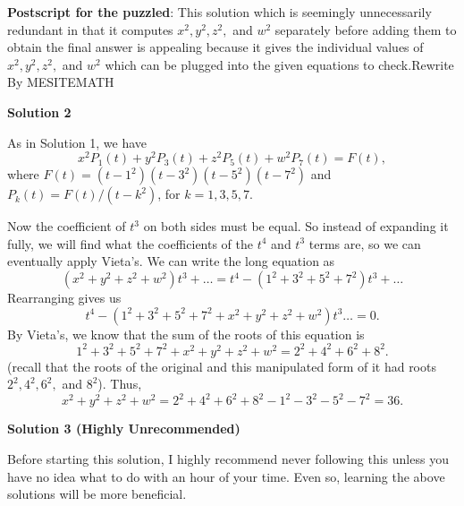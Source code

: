 \begin{enumerate}
 \textbf{Postscript for the puzzled}: This solution which is seemingly unnecessarily redundant in that it computes $x^2,y^2,z^2,$ and $w^2$ separately before adding them to obtain the final answer is appealing because it gives the individual values of $x^2,y^2,z^2,$ and $w^2$ which can be plugged into the given equations to check.Rewrite By MESITEMATH

 



\textbf{Solution 2}

As in Solution 1, we have 
 \[x^2P_1(t)+y^2P_3(t)+z^2P_5(t)+w^2P_7(t)=F(t),\]where $F(t)=(t-1^2)(t-3^2)(t-5^2)(t-7^2)$ and $P_k(t)=F(t)/(t-k^2)$, for $k=1,3,5,7$.

 Now the coefficient of $t^3$ on both sides must be equal. So instead of expanding it fully, we will find what the coefficients of the $t^4$ and $t^3$ terms are, so we can eventually apply Vieta's. We can write the long equation as 
 \[(x^2 + y^2 + z^2 + w^2)t^3 + \dots = t^4 - (1^2 + 3^2 + 5^2 + 7^2)t^3 + \dots\] Rearranging gives us 
 \[t^4 - (1^2 + 3^2 + 5^2 + 7^2 + x^2 + y^2 + z^2 + w^2)t^3 \dots = 0.\] By Vieta's, we know that the sum of the roots of this equation is 
 \[1^2 + 3^2 + 5^2 + 7^2 + x^2 + y^2 + z^2 + w^2 = 2^2 + 4^2 + 6^2 + 8^2.\] (recall that the roots of the original and this manipulated form of it had roots $2^2, 4^2, 6^2,$ and $8^2$). Thus, 
 \[x^2 + y^2 + z^2 + w^2 = 2^2 + 4^2 + 6^2 + 8^2 - 1^2 - 3^2 - 5^2 - 7^2 = \boxed{36}.\]




\textbf{Solution 3 (Highly Unrecommended)}

Before starting this solution, I highly recommend never following this unless you have no idea what to do with an hour of your time. Even so, learning the above solutions will be more beneficial.


\end{enumerate}
